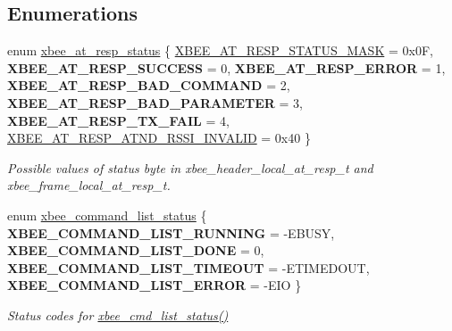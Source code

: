 \subsection*{Enumerations}
\begin{DoxyCompactItemize}
\item 
enum \hyperlink{group__xbee__atcmd_gac6a27f1b1ee32b75b6f966afbb347f22}{xbee\+\_\+at\+\_\+resp\+\_\+status} \{ \newline
\hyperlink{group__xbee__atcmd_ggac6a27f1b1ee32b75b6f966afbb347f22adb75bf991027151c1aa20a454e278145}{X\+B\+E\+E\+\_\+\+A\+T\+\_\+\+R\+E\+S\+P\+\_\+\+S\+T\+A\+T\+U\+S\+\_\+\+M\+A\+SK} = 0x0F, 
{\bfseries X\+B\+E\+E\+\_\+\+A\+T\+\_\+\+R\+E\+S\+P\+\_\+\+S\+U\+C\+C\+E\+SS} = 0, 
{\bfseries X\+B\+E\+E\+\_\+\+A\+T\+\_\+\+R\+E\+S\+P\+\_\+\+E\+R\+R\+OR} = 1, 
{\bfseries X\+B\+E\+E\+\_\+\+A\+T\+\_\+\+R\+E\+S\+P\+\_\+\+B\+A\+D\+\_\+\+C\+O\+M\+M\+A\+ND} = 2, 
\newline
{\bfseries X\+B\+E\+E\+\_\+\+A\+T\+\_\+\+R\+E\+S\+P\+\_\+\+B\+A\+D\+\_\+\+P\+A\+R\+A\+M\+E\+T\+ER} = 3, 
{\bfseries X\+B\+E\+E\+\_\+\+A\+T\+\_\+\+R\+E\+S\+P\+\_\+\+T\+X\+\_\+\+F\+A\+IL} = 4, 
\hyperlink{group__xbee__atcmd_ggac6a27f1b1ee32b75b6f966afbb347f22a52c349dd42d745e58fbeb90b51927947}{X\+B\+E\+E\+\_\+\+A\+T\+\_\+\+R\+E\+S\+P\+\_\+\+A\+T\+N\+D\+\_\+\+R\+S\+S\+I\+\_\+\+I\+N\+V\+A\+L\+ID} = 0x40
 \}\begin{DoxyCompactList}\small\item\em Possible values of {\ttfamily status} byte in xbee\+\_\+header\+\_\+local\+\_\+at\+\_\+resp\+\_\+t and xbee\+\_\+frame\+\_\+local\+\_\+at\+\_\+resp\+\_\+t. \end{DoxyCompactList}
\item 
enum \hyperlink{group__xbee__atcmd_ga3ec63530d743d1c91126c67493c3245d}{xbee\+\_\+command\+\_\+list\+\_\+status} \{ {\bfseries X\+B\+E\+E\+\_\+\+C\+O\+M\+M\+A\+N\+D\+\_\+\+L\+I\+S\+T\+\_\+\+R\+U\+N\+N\+I\+NG} = -\/\+E\+B\+U\+SY, 
{\bfseries X\+B\+E\+E\+\_\+\+C\+O\+M\+M\+A\+N\+D\+\_\+\+L\+I\+S\+T\+\_\+\+D\+O\+NE} = 0, 
{\bfseries X\+B\+E\+E\+\_\+\+C\+O\+M\+M\+A\+N\+D\+\_\+\+L\+I\+S\+T\+\_\+\+T\+I\+M\+E\+O\+UT} = -\/\+E\+T\+I\+M\+E\+D\+O\+UT, 
{\bfseries X\+B\+E\+E\+\_\+\+C\+O\+M\+M\+A\+N\+D\+\_\+\+L\+I\+S\+T\+\_\+\+E\+R\+R\+OR} = -\/\+E\+IO
 \}\begin{DoxyCompactList}\small\item\em Status codes for \hyperlink{group__xbee__atcmd_gafb2d1636c675066469ee388170ea27a0}{xbee\+\_\+cmd\+\_\+list\+\_\+status()} \end{DoxyCompactList}
\item 

\end{DoxyCompactItemize}

